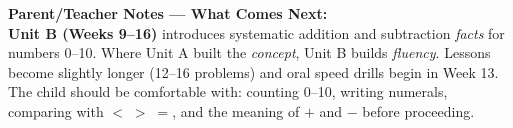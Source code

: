 \documentclass[12pt, letterpaper]{article}
\begin{document}
\bigskip
\begin{lessonbox}
\textbf{Parent/Teacher Notes — What Comes Next:}\\[4pt]
\textbf{Unit B (Weeks 9–16)} introduces systematic addition and subtraction \textit{facts} for numbers 0–10.
Where Unit A built the \textit{concept}, Unit B builds \textit{fluency}.
Lessons become slightly longer (12–16 problems) and oral speed drills begin in Week 13.\\[4pt]
The child should be comfortable with: counting 0–10, writing numerals, comparing with $<\;>\;=$,
and the meaning of $+$ and $-$ before proceeding.
\end{lessonbox}
\end{document}
